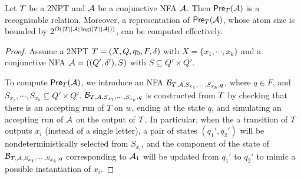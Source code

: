 \begin{lemma}\label{lem-2pt}
Let $T$ be a 2NPT and $\mathcal{A}$ be a conjunctive NFA $\mathcal{A}$. Then $\textsf{Pre}_{T}(\mathcal{A})$ is a recognisable relation. Moreover, a representation of $\textsf{Pre}_{T}(\mathcal{A})$, whose atom size is bounded by $2^{O(|T||\mathcal{A}|\log (|T||\mathcal{A}|))}$, can be computed effectively.
\end{lemma}

\begin{proof}
Assume a 2NPT $T=(X, Q, q_0, F, \delta)$ with $X = \{x_1,\cdots, x_k\}$ and a conjunctive NFA $\mathcal{A} = ((Q', \delta'), S)$ with $S \subseteq Q' \times Q'$. %

To compute $\textsf{Pre}_{T}(\mathcal{A})$, we introduce an NFA $\mathcal{B}_{T, \mathcal{A}, S_{x_1}, \cdots, S_{x_k}, q}$, %
%
where  $q \in F$, and  $S_{x_1}, \cdots, S_{x_k} \subseteq Q' \times Q'$.   
$\mathcal{B}_{T, \mathcal{A}, S_{x_1}, \cdots, S_{x_k}, q}$ is constructed from $T$  by checking that there is an accepting run of $T$ on $w$, ending at the state $q$, and simulating an accepting run of $\mathcal{A}$ on the output of $T$. In particular, when the a transition of $T$ outputs $x_i$ (instead of a single letter), a pair of states $(q_1', q_2')$ will be nondeterministically selected from $S_{x_i}$, and the component of the state of $\mathcal{B}_{T, \mathcal{A}, S_{x_1}, \cdots, S_{x_k}, q}$ corresponding to $\mathcal{A}_1$ will be updated from $q_1'$ to $q_2'$ to mimic a possible instantiation of $x_i$.  




\end{proof}
